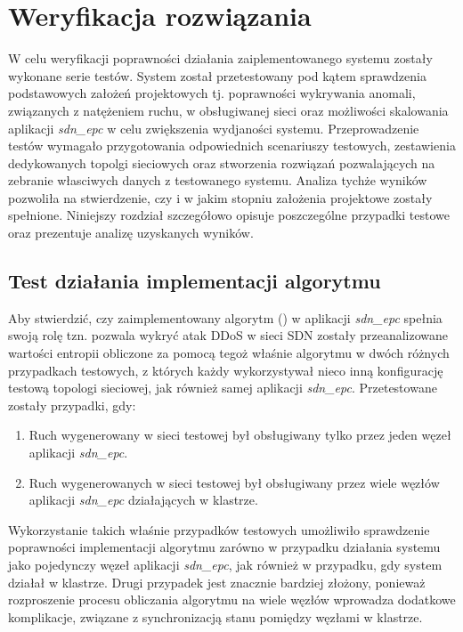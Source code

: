 \chapter{Weryfikacja rozwiązania}

W celu weryfikacji poprawności działania zaiplementowanego systemu zostały
wykonane serie testów. System został przetestowany pod kątem sprawdzenia
podstawowych założeń projektowych tj. poprawności wykrywania anomali, związanych
z natężeniem ruchu, w obsługiwanej sieci oraz możliwości skalowania
aplikacji \textit{sdn\_epc} w celu zwiększenia wydjaności systemu.
Przeprowadzenie testów wymagało przygotowania odpowiednich scenariuszy testowych,
zestawienia dedykowanych topolgi sieciowych oraz stworzenia rozwiązań
pozwalających na zebranie własciwych danych z testowanego systemu. Analiza
tychże wyników pozwoliła na stwierdzenie, czy i w jakim stopniu założenia
projektowe zostały spełnione. Niniejszy rozdział szczegółowo opisuje
poszczególne przypadki testowe oraz prezentuje analizę uzyskanych wyników.

\section{Test działania implementacji algorytmu}

 
Aby stwierdzić, czy zaimplementowany algorytm (\pageref{equ:entropy}) w aplikacji
\textit{sdn\_epc} spełnia swoją rolę tzn. pozwala wykryć atak DDoS w sieci SDN
zostały przeanalizowane wartości entropii obliczone za pomocą tegoż właśnie
algorytmu w dwóch różnych przypadkach testowych, z których każdy wykorzystywał
nieco inną konfigurację testową topologi sieciowej, jak również samej aplikacji
\textit{sdn\_epc}. Przetestowane zostały przypadki, gdy: 
\begin{enumerate}
  \item Ruch wygenerowany w sieci testowej był obsługiwany tylko przez jeden
    węzeł aplikacji \textit{sdn\_epc}.
  \item Ruch wygenerowanych w sieci testowej był obsługiwany przez wiele węzłów
    aplikacji \textit{sdn\_epc} działających w klastrze.
\end{enumerate}
Wykorzystanie takich właśnie przypadków testowych umożliwiło sprawdzenie
poprawności implementacji algorytmu zarówno w przypadku działania systemu jako
pojedynczy węzeł aplikacji \textit{sdn\_epc}, jak również w przypadku, gdy
system działał w klastrze. Drugi przypadek jest znacznie bardziej złożony,
ponieważ rozproszenie procesu obliczania algorytmu na wiele węzłów wprowadza
dodatkowe komplikacje, związane z synchronizacją stanu pomiędzy węzłami w
klastrze.

